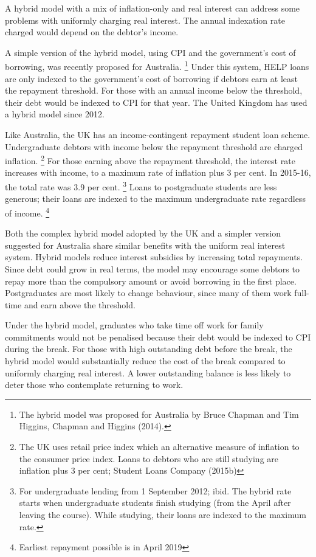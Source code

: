 \documentclass[embargoed]{grattan}
\begin{document}
A hybrid model with a mix of inflation-only and real interest can address some problems with uniformly charging real interest.
The annual indexation rate charged would depend on the debtor's income.

A simple version of the hybrid model, using \gls{CPI} and the government's cost of borrowing, was recently proposed for Australia.%
\footnote{The hybrid model was proposed for Australia by Bruce Chapman and Tim Higgins, Chapman and Higgins (2014).} Under this system, HELP loans are only indexed to the government's cost of borrowing if debtors earn at least the repayment threshold.
For those with an annual income below the threshold, their debt would be indexed to \gls{CPI} for that year.
The United Kingdom has used a hybrid model since 2012.

Like Australia, the UK has an income-contingent repayment student loan scheme.
Undergraduate debtors with income below the repayment threshold are charged inflation.%
\footnote{The UK uses retail price index which an alternative measure of inflation to the consumer price index.
Loans to debtors who are still studying are inflation plus 3 per cent; Student Loans Company (2015b)} For those earning above the repayment threshold, the interest rate increases with income, to a maximum rate of inflation plus 3 per cent.
In 2015-16, the total rate was 3.9 per cent.%
\footnote{For undergraduate lending from 1 September 2012; ibid.
The hybrid rate starts when undergraduate students finish studying (from the April after leaving the course).
While studying, their loans are indexed to the maximum rate.} Loans to postgraduate students are less generous; their loans are indexed to the maximum undergraduate rate regardless of income.%
\footnote{Earliest repayment possible is in April 2019}

Both the complex hybrid model adopted by the UK and a simpler version suggested for Australia share similar benefits with the uniform real interest system.
Hybrid models reduce interest subsidies by increasing total repayments.
Since debt could grow in real terms, the model may encourage some debtors to repay more than the compulsory amount or avoid borrowing in the first place.
Postgraduates are most likely to change behaviour, since many of them work full-time and earn above the threshold.

Under the hybrid model, graduates who take time off work for family commitments would not be penalised because their debt would be indexed to \gls{CPI} during the break.
For those with high outstanding debt before the break, the hybrid model would substantially reduce the cost of the break compared to uniformly charging real interest.
A lower outstanding balance is less likely to deter those who contemplate returning to work.
\end{document}

